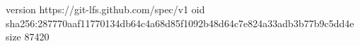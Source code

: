 version https://git-lfs.github.com/spec/v1
oid sha256:287770aaf11770134db64c4a68d85f1092b48d64c7e824a33adb3b77b9c5dd4e
size 87420
